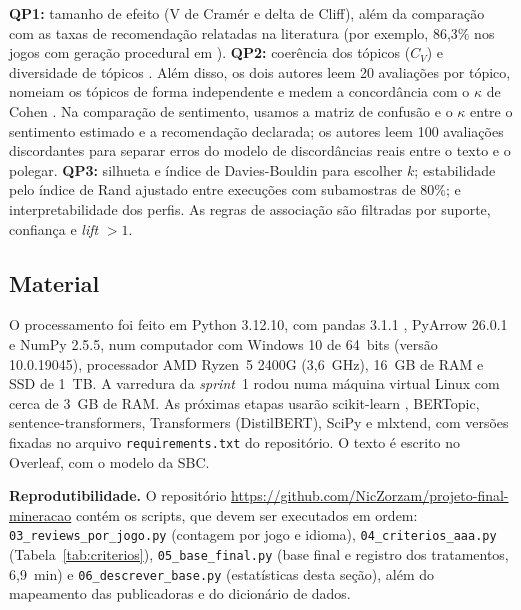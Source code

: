 \documentclass[12pt]{article}
\newcommand{\LINKGIT}{\url{https://github.com/NicZorzam/projeto-final-mineracao}}
\begin{document}
\textbf{QP1:} tamanho de efeito (V de Cramér e delta de Cliff), além da comparação com as taxas
de recomendação relatadas na literatura (por exemplo, 86,3\% nos jogos com geração procedural em
\cite{bazzaz2026}).
\textbf{QP2:} coerência dos tópicos ($C_V$) \cite{roder2015} e diversidade de tópicos
\cite{dieng2020}. Além disso, os dois autores leem 20 avaliações por tópico, nomeiam os tópicos de
forma independente e medem a concordância com o $\kappa$ de Cohen \cite{cohen1960}. Na
comparação de sentimento, usamos a matriz de confusão e o $\kappa$ entre o sentimento estimado
e a recomendação declarada; os autores leem 100 avaliações discordantes para separar erros do
modelo de discordâncias reais entre o texto e o polegar.
\textbf{QP3:} silhueta \cite{rousseeuw1987} e índice de Davies-Bouldin \cite{davies1979} para
escolher $k$; estabilidade pelo índice de Rand ajustado \cite{hubert1985} entre execuções com
subamostras de 80\%; e interpretabilidade dos perfis. As regras de associação são filtradas por
suporte, confiança e \textit{lift} $>1$.

\subsection{Material}

O processamento foi feito em Python 3.12.10, com pandas 3.1.1 \cite{mckinney2010}, PyArrow
26.0.1 e NumPy 2.5.5, num computador com Windows 10 de 64~bits (versão 10.0.19045), processador AMD Ryzen~5 2400G (3,6~GHz), 16~GB de RAM e SSD de 1~TB. A varredura da \textit{sprint}~1 rodou numa máquina virtual
Linux com cerca de 3~GB de RAM. As próximas etapas usarão scikit-learn \cite{pedregosa2011},
BERTopic, sentence-transformers, Transformers \cite{wolf2020} (DistilBERT), SciPy e mlxtend, com versões fixadas no arquivo
\texttt{requirements.txt} do repositório. O texto é escrito no Overleaf, com o modelo da SBC.

\textbf{Reprodutibilidade.} O repositório \LINKGIT{} contém os scripts, que devem ser executados
em ordem: \texttt{03\_reviews\_por\_jogo.py} (contagem por jogo e idioma),
\texttt{04\_criterios\_aaa.py} (Tabela~\ref{tab:criterios}), \texttt{05\_base\_final.py} (base
final e registro dos tratamentos, 6,9~min) e \texttt{06\_descrever\_base.py} (estatísticas desta seção),
além do mapeamento das publicadoras e do dicionário de dados.



\end{document}
